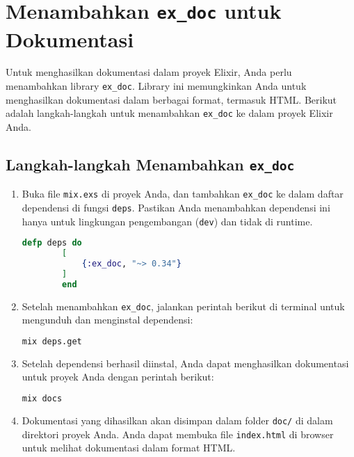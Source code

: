 \section{Menambahkan \texttt{ex\_doc} untuk Dokumentasi}

Untuk menghasilkan dokumentasi dalam proyek Elixir, Anda perlu menambahkan library \texttt{ex\_doc}. Library ini memungkinkan Anda untuk menghasilkan dokumentasi dalam berbagai format, termasuk HTML. Berikut adalah langkah-langkah untuk menambahkan \texttt{ex\_doc} ke dalam proyek Elixir Anda.

\subsection{Langkah-langkah Menambahkan \texttt{ex\_doc}}

\begin{enumerate}
	\item Buka file \texttt{mix.exs} di proyek Anda, dan tambahkan \texttt{ex\_doc} ke dalam daftar dependensi di fungsi \texttt{deps}. Pastikan Anda menambahkan dependensi ini hanya untuk lingkungan pengembangan (\texttt{dev}) dan tidak di runtime.
	
	\begin{lstlisting}[language=Elixir]
		defp deps do
		[
			{:ex_doc, "~> 0.34"}
		]
		end
	\end{lstlisting}
	
	\item Setelah menambahkan \texttt{ex\_doc}, jalankan perintah berikut di terminal untuk mengunduh dan menginstal dependensi:
	
	\begin{lstlisting}[language=Bash]
		mix deps.get
	\end{lstlisting}
	
	\item Setelah dependensi berhasil diinstal, Anda dapat menghasilkan dokumentasi untuk proyek Anda dengan perintah berikut:
	
	\begin{lstlisting}[language=Bash]
		mix docs
	\end{lstlisting}
	
	\item Dokumentasi yang dihasilkan akan disimpan dalam folder \texttt{doc/} di dalam direktori proyek Anda. Anda dapat membuka file \texttt{index.html} di browser untuk melihat dokumentasi dalam format HTML.
\end{enumerate}

